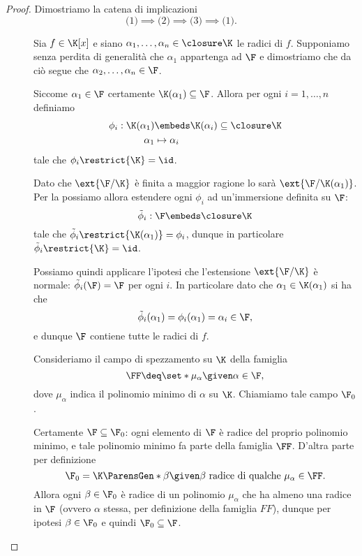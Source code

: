 \begin{proof}
    Dimostriamo la catena di implicazioni \[
        \text{(1)} \implies \text{(2)} \implies \text{(3)}\implies \text{(1)}.
    \]
    \begin{description}
        \item[]
        Sia $f \in \K[x]$ e siano $\alpha_1, \dots, \alpha_n \in \closure\K$ le radici di $f$. Supponiamo senza perdita di generalità che $\alpha_1$ appartenga ad $\F$ e dimostriamo che da ciò segue che $\alpha_2, \dots, \alpha_n \in \F$.
        
        Siccome $\alpha_1 \in \F$ certamente $\K(\alpha_1) \subseteq \F$. Allora per ogni $i = 1, \dots, n$ definiamo \begin{align*}
            \phi_i : \K(\alpha_1) &\embeds \K(\alpha_i) \subseteq \closure\K \\
            \alpha_1 &\mapsto \alpha_i
        \end{align*} tale che $\phi_i\restrict{\K} = \id$.
        
        Dato che $\ext{\F / \K}$ è finita a maggior ragione lo sarà $\ext{\F / \K(\alpha_1)}$. Per la  possiamo allora estendere ogni $\phi_i$ ad un'immersione definita su $\F$: \[
            \tilde\phi_i : \F \embeds \closure\K
        \] tale che $\tilde\phi_i\restrict{\K(\alpha_1)} = \phi_i$, dunque in particolare $\tilde\phi_i\restrict{\K} = \id$.

        Possiamo quindi applicare l'ipotesi che l'estensione $\ext{\F / \K}$ è normale: $\tilde\phi_i(\F) = \F$ per ogni $i$. In particolare dato che $\alpha_1 \in \K(\alpha_1)$ si ha che \[
            \tilde\phi_i(\alpha_1) = \phi_i(\alpha_1) = \alpha_i \in \F,
        \] e dunque $\F$ contiene tutte le radici di $f$. 
        \item[]
        Consideriamo il campo di spezzamento su $\K$ della famiglia \[
            \FF \deq \set*{\mu_\alpha \given \alpha \in \F},
        \] dove $\mu_\alpha$ indica il polinomio minimo di $\alpha$ su $\K$. Chiamiamo tale campo $\F_0$.
        
        Certamente $\F \subseteq \F_0$: ogni elemento di $\F$ è radice del proprio polinomio minimo, e tale polinomio minimo fa parte della famiglia $\FF$. D'altra parte per definizione \[
            \F_0 = \K\ParensGen*{\beta \given \beta \text{ radice di qualche } \mu_\alpha \in \FF}.
        \] Allora ogni $\beta \in \F_0$ è radice di un polinomio $\mu_\alpha$ che ha almeno una radice in $\F$ (ovvero $\alpha$ stessa, per definizione della famiglia $FF$), dunque per ipotesi $\beta \in \F_0$ e quindi $\F_0 \subseteq \F$.
        

\end{description}
\end{proof}
